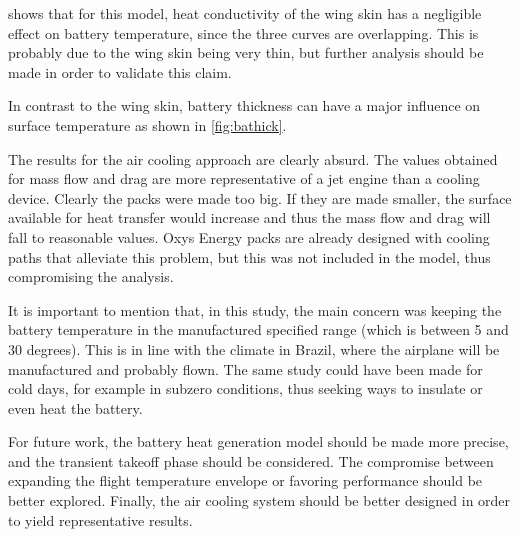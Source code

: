  shows that for this model, heat conductivity of the wing skin has a negligible effect on battery temperature, since the three curves are overlapping. This is probably due to the wing skin being very thin, but further analysis should be made in order to validate this claim.

In contrast to the wing skin, battery thickness can have a major influence on surface temperature as shown in \cref{fig:bathick}. 

The results for the air cooling approach are clearly absurd. The values obtained for mass flow and drag are more representative of a jet engine than a cooling device. Clearly the packs were made too big. If they are made smaller, the surface available for heat transfer would increase and thus the mass flow and drag will fall to reasonable values. Oxys Energy packs are already designed with cooling paths that alleviate this problem, but this was not included in the model, thus compromising the analysis.

It is important to mention that, in this study, the main concern was keeping the battery temperature in the manufactured specified range (which is between 5 and 30 degrees). This is in line with the climate in Brazil, where the airplane will be manufactured and probably flown. The same study could have been made for cold days, for example in subzero conditions, thus seeking ways to insulate or even heat the battery.

For future work, the battery heat generation model should be made more precise, and the transient takeoff phase should be considered. The compromise between expanding the flight temperature envelope or favoring performance should be better explored. Finally, the air cooling system should be better designed in order to yield representative results.